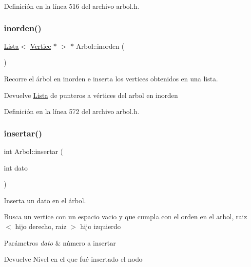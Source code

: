 Definición en la línea 516 del archivo arbol.\+h.

\mbox{\label{classArbol_a80a0c3cf2d7f3e92a5c8e5504947dab5}} 
\subsubsection{\texorpdfstring{inorden()}{inorden()}}
{\footnotesize\ttfamily \hyperlink{classLista}{Lista}$<$ \hyperlink{classVertice}{Vertice} $\ast$ $>$ $\ast$ Arbol\+::inorden (\begin{DoxyParamCaption}{ }\end{DoxyParamCaption})}



Recorre el árbol en inorden e inserta los vertices obtenidos en una lista. 

\begin{DoxyReturn}{Devuelve}
\hyperlink{classLista}{Lista} de punteros a vértices del arbol en inorden 
\end{DoxyReturn}


Definición en la línea 572 del archivo arbol.\+h.

\mbox{\label{classArbol_af332559b5f9d894ecc6a707bb1550ae2}} 
\subsubsection{\texorpdfstring{insertar()}{insertar()}}
{\footnotesize\ttfamily int Arbol\+::insertar (\begin{DoxyParamCaption}\item[{int}]{dato }\end{DoxyParamCaption})}



Inserta un dato en el árbol. 

Busca un vertice con un espacio vacio y que cumpla con el orden en el arbol, raiz $<$ hijo derecho, raiz $>$ hijo izquierdo


\begin{DoxyParams}{Parámetros}
{\em dato} & número a insertar \\
\hline
\end{DoxyParams}
\begin{DoxyReturn}{Devuelve}
Nivel en el que fué insertado el nodo 
\end{DoxyReturn}


